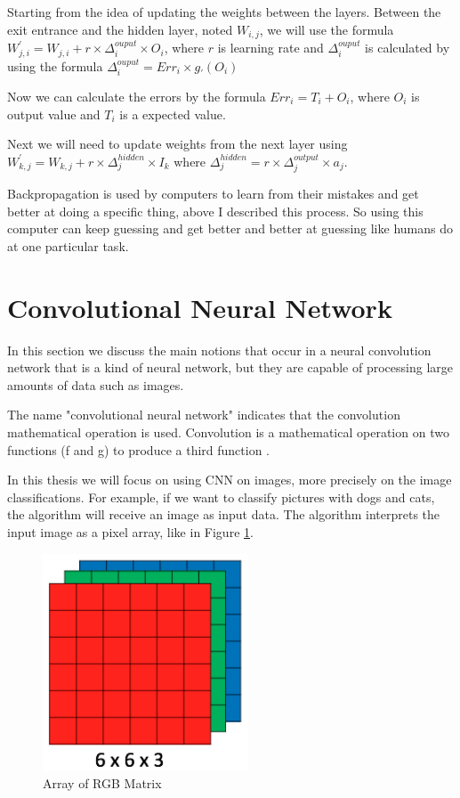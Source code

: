 Starting from the idea of updating the weights between the layers. 
Between the exit entrance and the hidden layer, noted $W_{i,j}$,  we will use the formula 
$W^{'}_{j,i} = W_{j,i} + r \times \Delta_i^{ouput} \times O_i$, where $r$ is learning rate 
and $\Delta_i^{ouput}$ is calculated by using the formula $\Delta_i^{ouput} = Err_i  \times g_{'}(O_i)$

Now we can calculate the errors by the formula $Err_i = T_i + O_i$, where $O_i$ is output value and $T_i$ is a expected value.

Next we will need to update weights from the next layer using $W^{'}_{k,j} = W_{k,j} + r \times \Delta_j^{hidden} \times I_k$ where 
$\Delta_j^{hidden} = r  \times \Delta_j^{output} \times  a_j$.

Backpropagation is used by computers to learn from their mistakes and 
get better at doing a specific thing, above I described this process.
So using this computer can keep guessing and
get better and better at guessing like humans do at one particular task.


\section{Convolutional Neural Network}
In this section we discuss the main notions that occur in 
a neural convolution network that is a  kind of neural network, but they are capable of processing large amounts of data such as images.

The name "convolutional neural network" indicates that the convolution mathematical operation is used. 
Convolution is a mathematical operation on two functions (f and g) to produce a third function \cite{Mallat:2008:WTS:1525499}. 

In this thesis we will focus on using CNN on images, more precisely on the image classifications.
For example, if we want to classify pictures with dogs and cats,
the algorithm will receive an image as input data.
The algorithm interprets the input image as a pixel array, like in Figure \ref{fig:img-rgb}.

\begin{figure}[htbp]
  \centerline{\includegraphics[scale=0.75]{fig/img-rgb.png}}  
  \caption{Array of RGB Matrix}
  \label{fig:img-rgb}
\end{figure}

